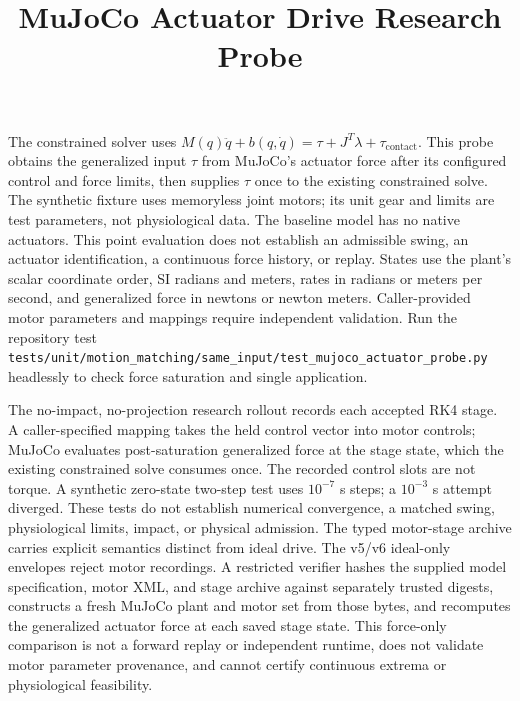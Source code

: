 \documentclass{article}
\title{MuJoCo Actuator Drive Research Probe}
\begin{document}
\maketitle
The constrained solver uses $M(q)\ddot q + b(q,\dot q)=\tau + J^T\lambda+\tau_{\mathrm{contact}}$. This probe obtains the generalized input $\tau$ from MuJoCo's actuator force after its configured control and force limits, then supplies $\tau$ once to the existing constrained solve. The synthetic fixture uses memoryless joint motors; its unit gear and limits are test parameters, not physiological data. The baseline model has no native actuators. This point evaluation does not establish an admissible swing, an actuator identification, a continuous force history, or replay. States use the plant's scalar coordinate order, SI radians and meters, rates in radians or meters per second, and generalized force in newtons or newton meters. Caller-provided motor parameters and mappings require independent validation. Run the repository test \texttt{tests/unit/motion\_matching/same\_input/test\_mujoco\_actuator\_probe.py} headlessly to check force saturation and single application.

The no-impact, no-projection research rollout records each accepted RK4 stage. A caller-specified mapping takes the held control vector into motor controls; MuJoCo evaluates post-saturation generalized force at the stage state, which the existing constrained solve consumes once. The recorded control slots are not torque. A synthetic zero-state two-step test uses $10^{-7}$ s steps; a $10^{-3}$ s attempt diverged. These tests do not establish numerical convergence, a matched swing, physiological limits, impact, or physical admission.
The typed motor-stage archive carries explicit semantics distinct from ideal drive. The v5/v6 ideal-only envelopes reject motor recordings. A restricted verifier hashes the supplied model specification, motor XML, and stage archive against separately trusted digests, constructs a fresh MuJoCo plant and motor set from those bytes, and recomputes the generalized actuator force at each saved stage state. This force-only comparison is not a forward replay or independent runtime, does not validate motor parameter provenance, and cannot certify continuous extrema or physiological feasibility.
\end{document}
